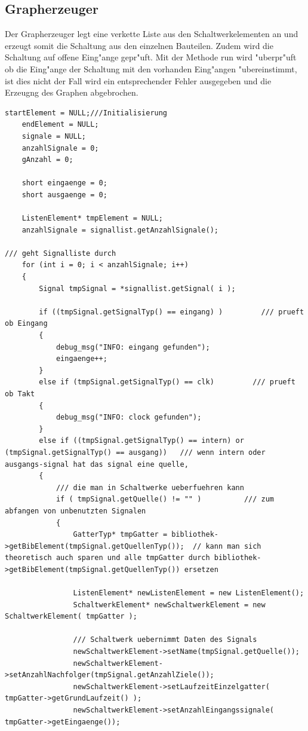 \documentclass[a4paper,10pt,twoside]{report}
\begin{document}
\subsection{Grapherzeuger}
Der Grapherzeuger legt eine verkette Liste aus den Schaltwerkelementen an und erzeugt somit die Schaltung aus den einzelnen Bauteilen. Zudem wird die Schaltung auf offene Eing"ange gepr"uft. Mit der Methode run wird "uberpr"uft ob die Eing"ange der Schaltung mit den vorhanden Eing"angen "ubereinstimmt, ist dies nicht der Fall wird ein entsprechender Fehler ausgegeben und die Erzeugng des Graphen abgebrochen.
\begin{lstlisting}
startElement = NULL;///Initialisierung
    endElement = NULL;
    signale = NULL;
    anzahlSignale = 0;
    gAnzahl = 0;

    short eingaenge = 0;
    short ausgaenge = 0;

    ListenElement* tmpElement = NULL;
    anzahlSignale = signallist.getAnzahlSignale();

/// geht Signalliste durch
    for (int i = 0; i < anzahlSignale; i++)
    {
        Signal tmpSignal = *signallist.getSignal( i );

        if ((tmpSignal.getSignalTyp() == eingang) )         /// prueft ob Eingang
        {
            debug_msg("INFO: eingang gefunden");
            eingaenge++;
        }
        else if (tmpSignal.getSignalTyp() == clk)         /// prueft ob Takt
        {
            debug_msg("INFO: clock gefunden");
        }
        else if ((tmpSignal.getSignalTyp() == intern) or (tmpSignal.getSignalTyp() == ausgang))   /// wenn intern oder ausgangs-signal hat das signal eine quelle,
        {
            /// die man in Schaltwerke ueberfuehren kann
            if ( tmpSignal.getQuelle() != "" )          /// zum abfangen von unbenutzten Signalen
            {
                GatterTyp* tmpGatter = bibliothek->getBibElement(tmpSignal.getQuellenTyp());  // kann man sich theoretisch auch sparen und alle tmpGatter durch bibliothek->getBibElement(tmpSignal.getQuellenTyp()) ersetzen

                ListenElement* newListenElement = new ListenElement();
                SchaltwerkElement* newSchaltwerkElement = new SchaltwerkElement( tmpGatter );

                /// Schaltwerk uebernimmt Daten des Signals
                newSchaltwerkElement->setName(tmpSignal.getQuelle());
                newSchaltwerkElement->setAnzahlNachfolger(tmpSignal.getAnzahlZiele());
                newSchaltwerkElement->setLaufzeitEinzelgatter( tmpGatter->getGrundLaufzeit() );
                newSchaltwerkElement->setAnzahlEingangssignale( tmpGatter->getEingaenge());


\end{lstlisting}
\end{document}
